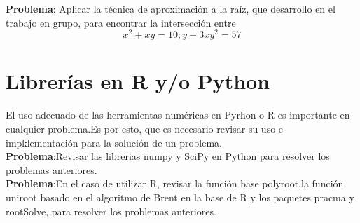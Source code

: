 \documentclass[12pt,letterpaper]{exam}
\begin{document}
\textbf{Problema}: Aplicar la  técnica de aproximación a la raíz, que desarrollo en el trabajo en grupo, para encontrar la intersección entre 
\begin{equation}
	x^{2}+xy=10;y+3xy^{2}=57
\end{equation} 
 

\section{Librerías en R y/o Python}

El uso adecuado de las herramientas numéricas en Pyrhon o R es importante en cualquier problema.Es por esto, que es necesario revisar su uso e impklementación para la solución de un problema.\\ \textbf{Problema}:Revisar las librerias numpy y SciPy en Python para  resolver los problemas anteriores.\\
\textbf{Problema}:En el caso de utilizar R, revisar la función base polyroot,la función uniroot basado en el algoritmo de Brent en la base de R y los paquetes pracma y rootSolve, para resolver los problemas anteriores. 
\end{document}
